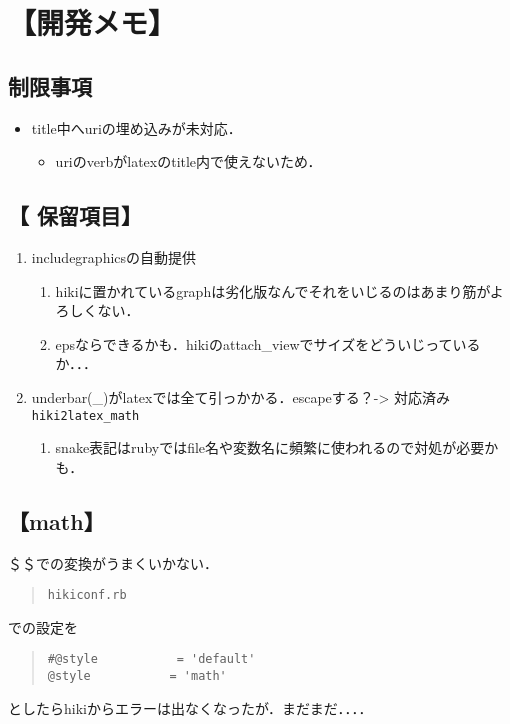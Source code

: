 \documentclass[10pt,a4jpaper]{jsarticle}
\begin{document}
\section{【開発メモ】}
\subsection{制限事項}\begin{itemize}
\item title中へuriの埋め込みが未対応．\begin{itemize}
\item uriのverbがlatexのtitle内で使えないため．
\end{itemize}
\end{itemize}
\subsection{【 保留項目】}\begin{enumerate}
\item includegraphicsの自動提供\begin{enumerate}
\item hikiに置かれているgraphは劣化版なんでそれをいじるのはあまり筋がよろしくない．
\item epsならできるかも．hikiのattach\_viewでサイズをどういじっているか．．．
\end{enumerate}
\item underbar(\_)がlatexでは全て引っかかる．escapeする？-> 対応済み \verb|hiki2latex_math|\begin{enumerate}
\item snake表記はrubyではfile名や変数名に頻繁に使われるので対処が必要かも．
\end{enumerate}
\end{enumerate}
\subsection{【math】}
＄＄での変換がうまくいかない．
\begin{quote}\begin{verbatim}
hikiconf.rb
\end{verbatim}\end{quote}
での設定を
\begin{quote}\begin{verbatim}
#@style           = 'default'
@style           = 'math'
\end{verbatim}\end{quote}
としたらhikiからエラーは出なくなったが．まだまだ．．．．
\end{document}
